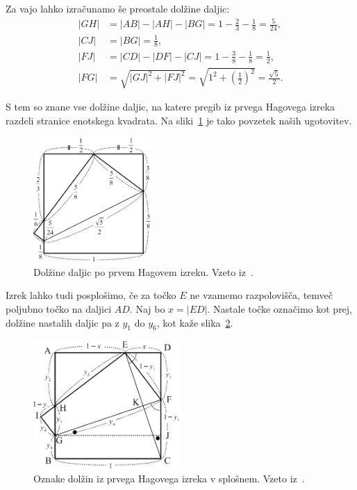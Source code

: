 Za vajo lahko izračunamo še preostale dolžine daljic:
\begin{align*}
    |GH| &= |AB| - |AH| - |BG| = 1 - \frac{2}{3} - \frac{1}{8} = \frac{5}{24},\\
    |CJ| &= |BG| = \frac{1}{8},\\
    |FJ| &= |CD| - |DF| - |CJ| = 1 - \frac{3}{8} - \frac{1}{8} = \frac{1}{2},\\
    |FG| &= \sqrt{|GJ|^2 + |FJ|^2} = \sqrt{1^2 + \left(\frac{1}{2}\right)^2} = \frac{\sqrt{5}}{2}.
\end{align*}

S tem so znane vse dolžine daljic, na katere pregib iz prvega Hagovega izreka razdeli stranice enotskega kvadrata. Na sliki~\ref{fig:hagov_izrek1_st} je tako povzetek naših ugotovitev.

\begin{figure}[h]
    \centering
    \includegraphics[width=0.4\textwidth]{images/hagovi_izreki/hagov_izrek1_stevilke.png}
    \caption[Prvi Hagov izrek v številkah]{Dolžine daljic po prvem Hagovem izreku. Vzeto iz~\cite[str. 7]{haga2008}.}
    \label{fig:hagov_izrek1_st}
\end{figure}

Izrek lahko tudi posplošimo, če za točko $E$ ne vzamemo razpolovišča, temveč poljubno točko na daljici $AD$. Naj bo $x = |ED|$. Nastale točke označimo kot prej, dolžine nastalih daljic pa z $y_1$ do $y_6$, kot kaže slika~\ref{fig:hagov_izrek1_splosen}.

\begin{figure}[h]
    \centering
    \includegraphics[width=0.5\textwidth]{images/hagovi_izreki/hagov_izrek1_splosen.png}
    \caption[Prvi Hagov izrek v splošnem]{Oznake dolžin iz prvega Hagovega izreka v splošnem. Vzeto iz~\cite[str. 9]{haga2008}.}
    \label{fig:hagov_izrek1_splosen}
\end{figure}

